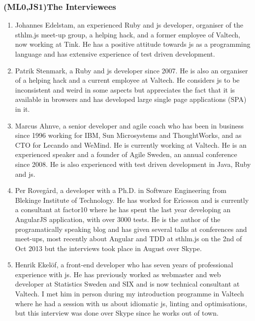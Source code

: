 \documentclass[11pt]{article}
\begin{document}
\subsubsection{(ML0,JS1)The Interviewees}
\label{ssubsec:interviewees}

\begin{enumerate}
\item Johannes Edelstam, an experienced Ruby and \gls{js} developer, organiser of the sthlm.js meet-up group, a helping hack, and a former employee of Valtech, now working at Tink. He has a positive attitude towards \gls{js} as a programming language and has extensive experience of test driven development.

\item Patrik Stenmark, a Ruby and \gls{js} developer since 2007. He is also an organiser of a helping hack and a current employee at Valtech. He considers \gls{js} to be inconsistent and weird in some aspects but appreciates the fact that it is available in browsers and has developed large single page applications (SPA) in it.

\item Marcus Ahnve, a senior developer and agile coach who has been in business since 1996 working for IBM, Sun Microsystems and ThoughtWorks, and as CTO for Lecando and WeMind. He is currently working at Valtech. He is an experienced speaker and a founder of Agile Sweden, an annual conference since 2008. He is also experienced with test driven development in Java, Ruby and \gls{js}.

\item Per Rovegård, a developer with a Ph.D. in Software Engineering from Blekinge Institute of Technology. He has worked for Ericsson and is currently a consultant at factor10 where he has spent the last year developing an AngularJS application, with over 3000 tests. He is the author of the programatically speaking blog and has given several talks at conferences and meet-ups, most recently about Angular and TDD at sthlm.js on the 2nd of Oct 2013 but the interviews took place in August over Skype.

\item Henrik Ekelöf, a front-end developer who has seven years of professional experience with \gls{js}. He has previously worked as webmaster and web developer at Statistics Sweden and SIX and is now technical consultant at Valtech. I met him in person during my introduction programme in Valtech where he had a session with us about idiomatic \gls{js}, linting and optimisations, but this interview was done over Skype since he works out of town.
\end{enumerate}
\end{document}
